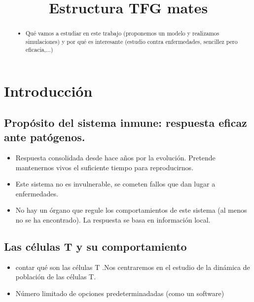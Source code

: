 \documentclass{article}
\title{Estructura TFG mates}
\begin{document}
\maketitle

\newpage
\tableofcontents

\newpage

\begin{abstract}
    \begin{itemize}
        \item Qué vamos a estudiar en este trabajo (proponemos un modelo y realizamos simulaciones) y por qué es interesante (estudio contra enfermedades, sencillez pero eficacia,...)
    \end{itemize}
\end{abstract}

\section{Introducción}
    \subsection{Propósito del sistema inmune: respuesta eficaz ante patógenos.}
    
        \begin{itemize}
            \item Respuesta consolidada desde hace años por la evolución. Pretende mantenernos vivos el suficiente tiempo para reproducirnos.
            \item Este sistema no es invulnerable, se cometen fallos que dan lugar a enfermedades.
            \item No hay un órgano que regule los comportamientos de este sistema (al menos no se ha encontrado). La respuesta se basa en información local.
           
        \end{itemize}
    
    \subsection{Las células T y su comportamiento}
        \begin{itemize}
            \item  contar qué son las células T .Nos centraremos en el estudio de la dinámica de población de las células T.
            \item Número limitado de opciones predeterminadadas (como un software)
        \end{itemize}
        
\end{document}
